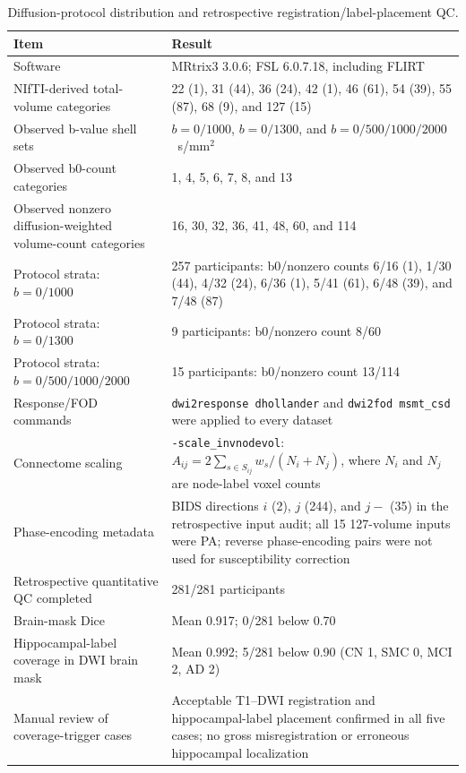 \documentclass{article}
\begin{document}
\begin{table}[!htbp]
\color{blue}
\centering
\caption{Diffusion-protocol distribution and retrospective registration/label-placement QC.}
\label{tab:protocol_qc_summary}
\footnotesize
\begin{tabularx}{\textwidth}{@{}p{}X@{}}
\toprule
Item & Result\\
\midrule
Software & MRtrix3 3.0.6; FSL 6.0.7.18, including FLIRT\\
NIfTI-derived total-volume categories & 22 (1), 31 (44), 36 (24), 42 (1), 46 (61), 54 (39), 55 (87), 68 (9), and 127 (15)\\
Observed b-value shell sets & $b=0/1000$, $b=0/1300$, and $b=0/500/1000/2000$~s/mm$^2$\\
Observed b0-count categories & 1, 4, 5, 6, 7, 8, and 13\\
Observed nonzero diffusion-weighted volume-count categories & 16, 30, 32, 36, 41, 48, 60, and 114\\
Protocol strata: $b=0/1000$ & 257 participants: b0/nonzero counts 6/16 (1), 1/30 (44), 4/32 (24), 6/36 (1), 5/41 (61), 6/48 (39), and 7/48 (87)\\
Protocol strata: $b=0/1300$ & 9 participants: b0/nonzero count 8/60\\
Protocol strata: $b=0/500/1000/2000$ & 15 participants: b0/nonzero count 13/114\\
Response/FOD commands & \texttt{dwi2response dhollander} and \texttt{dwi2fod msmt\_csd} were applied to every dataset\\
Connectome scaling & \texttt{-scale\_invnodevol}: $A_{ij}=2\sum_{s\in S_{ij}}w_s/(N_i+N_j)$, where $N_i$ and $N_j$ are node-label voxel counts\\
Phase-encoding metadata & BIDS directions $i$ (2), $j$ (244), and $j-$ (35) in the retrospective input audit; all 15 127-volume inputs were PA; reverse phase-encoding pairs were not used for susceptibility correction\\
Retrospective quantitative QC completed & 281/281 participants\\
Brain-mask Dice & Mean 0.917; 0/281 below 0.70\\
Hippocampal-label coverage in DWI brain mask & Mean 0.992; 5/281 below 0.90 (CN 1, SMC 0, MCI 2, AD 2)\\
Manual review of coverage-trigger cases & Acceptable T1--DWI registration and hippocampal-label placement confirmed in all five cases; no gross misregistration or erroneous hippocampal localization\\

\end{tabularx}
\end{table}
\end{document}
